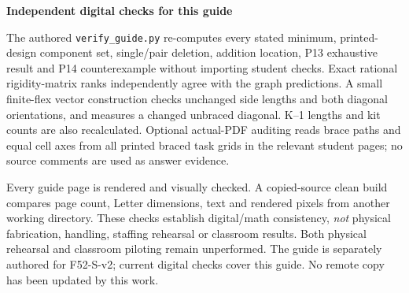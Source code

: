 \documentclass[letterpaper,11pt]{article}
\newcommand{\sub}[1]{\par\textbf{#1}\par}
\begin{document}
\sub{Independent digital checks for this guide}
The authored \texttt{verify\_guide.py} re-computes every stated minimum, printed-design component set, single/pair deletion, addition location, P13 exhaustive result and P14 counterexample without importing student checks. Exact rational rigidity-matrix ranks independently agree with the graph predictions. A small finite-flex vector construction checks unchanged side lengths and both diagonal orientations, and measures a changed unbraced diagonal. K--1 lengths and kit counts are also recalculated. Optional actual-PDF auditing reads brace paths and equal cell axes from all printed braced task grids in the relevant student pages; no source comments are used as answer evidence.

Every guide page is rendered and visually checked. A copied-source clean build compares page count, Letter dimensions, text and rendered pixels from another working directory. These checks establish digital/math consistency, \emph{not} physical fabrication, handling, staffing rehearsal or classroom results. Both physical rehearsal and classroom piloting remain unperformed. The guide is separately authored for F52-S-v2; current digital checks cover this guide. No remote copy has been updated by this work.
\end{document}
